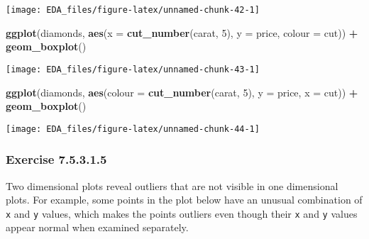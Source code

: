 \documentclass[]{book}
\newenvironment{Shaded}{\begin{snugshade}}{\end{snugshade}}
\newcommand{\DataTypeTok}[1]{\textcolor[rgb]{0.13,0.29,0.53}{#1}}
\newcommand{\DecValTok}[1]{\textcolor[rgb]{0.00,0.00,0.81}{#1}}
\newcommand{\KeywordTok}[1]{\textcolor[rgb]{0.13,0.29,0.53}{\textbf{#1}}}
\newcommand{\NormalTok}[1]{#1}
\newcommand{\OperatorTok}[1]{\textcolor[rgb]{0.81,0.36,0.00}{\textbf{#1}}}
\newcommand{\StringTok}[1]{\textcolor[rgb]{0.31,0.60,0.02}{#1}}
\theoremstyle{plain}
\theoremstyle{remark}
\begin{document}
\begin{center}\texttt{[image: EDA\_files/figure-latex/unnamed-chunk-42-1]} \end{center}

\begin{Shaded}
\begin{Highlighting}[]
\KeywordTok{ggplot}\NormalTok{(diamonds, }\KeywordTok{aes}\NormalTok{(}\DataTypeTok{x =} \KeywordTok{cut_number}\NormalTok{(carat, }\DecValTok{5}\NormalTok{), }\DataTypeTok{y =}\NormalTok{ price, }\DataTypeTok{colour =}\NormalTok{ cut)) }\OperatorTok{+}
\StringTok{  }\KeywordTok{geom_boxplot}\NormalTok{()}
\end{Highlighting}
\end{Shaded}

\begin{center}\texttt{[image: EDA\_files/figure-latex/unnamed-chunk-43-1]} \end{center}

\begin{Shaded}
\begin{Highlighting}[]
\KeywordTok{ggplot}\NormalTok{(diamonds, }\KeywordTok{aes}\NormalTok{(}\DataTypeTok{colour =} \KeywordTok{cut_number}\NormalTok{(carat, }\DecValTok{5}\NormalTok{), }\DataTypeTok{y =}\NormalTok{ price, }\DataTypeTok{x =}\NormalTok{ cut)) }\OperatorTok{+}
\StringTok{  }\KeywordTok{geom_boxplot}\NormalTok{()}
\end{Highlighting}
\end{Shaded}

\begin{center}\texttt{[image: EDA\_files/figure-latex/unnamed-chunk-44-1]} \end{center}

\hypertarget{exercise-7.5.3.1.5}{%
\subsubsection*{\texorpdfstring{Exercise
{7.5.3.1.5}}{Exercise 7.5.3.1.5}}\label{exercise-7.5.3.1.5}}

Two dimensional plots reveal outliers that are not visible in one
dimensional plots. For example, some points in the plot below have an
unusual combination of \texttt{x} and \texttt{y} values, which makes the
points outliers even though their \texttt{x} and \texttt{y} values
appear normal when examined separately.
\end{document}
